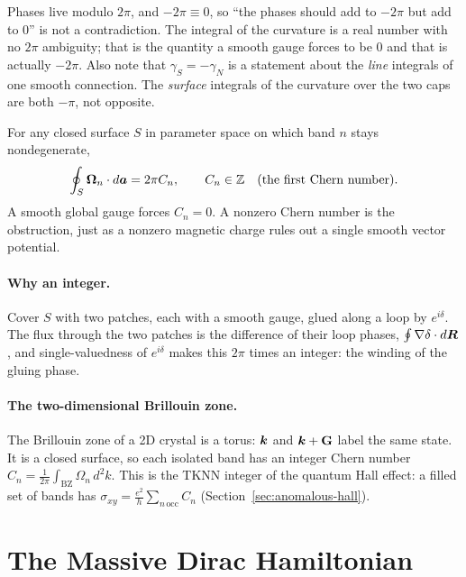 \begin{fact}
Phases live modulo $2\pi$, and $-2\pi\equiv0$, so ``the phases should add to $-2\pi$ but add to $0$'' is not a contradiction. The integral of the curvature is a real number with no $2\pi$ ambiguity; that is the quantity a smooth gauge forces to be $0$ and that is actually $-2\pi$. Also note that $\gamma_S = -\gamma_N$ is a statement about the \emph{line} integrals of one smooth connection. The \emph{surface} integrals of the curvature over the two caps are both $-\pi$, not opposite.
\end{fact}

\begin{theorem}
For any closed surface $S$ in parameter space on which band $n$ stays nondegenerate,
\[
    \oint_S\bm{\Omega}_n\cdot d\bm{a} = 2\pi C_n,
    \qquad
    C_n\in\mathbb{Z}\quad(\text{the first Chern number}).
\]
A smooth global gauge forces $C_n = 0$. A nonzero Chern number is the obstruction, just as a nonzero magnetic charge rules out a single smooth vector potential.
\end{theorem}

\paragraph{Why an integer.} Cover $S$ with two patches, each with a smooth gauge, glued along a loop by $e^{i\delta}$. The flux through the two patches is the difference of their loop phases, $\oint\nabla\delta\cdot d\bm{R}$, and single-valuedness of $e^{i\delta}$ makes this $2\pi$ times an integer: the winding of the gluing phase.

\paragraph{The two-dimensional Brillouin zone.} The Brillouin zone of a 2D crystal is a torus: $\bm{k}$ and $\lvect{k}+\cvect{G}$ label the same state. It is a closed surface, so each isolated band has an integer Chern number $C_n = \frac{1}{2\pi}\int_{\text{BZ}}\Omega_n\,d^2k$. This is the TKNN integer of the quantum Hall effect: a filled set of bands has $\sigma_{xy} = \frac{e^2}{h}\sum_{n\,\text{occ}}C_n$ (Section~\ref{sec:anomalous-hall}).

\section{The Massive Dirac Hamiltonian}

